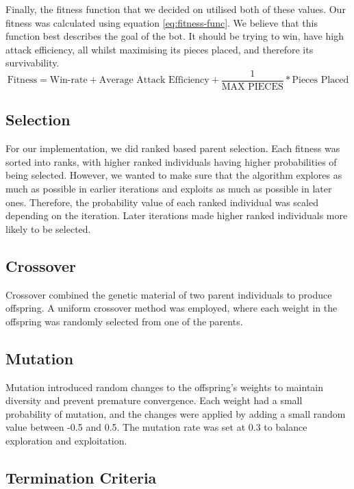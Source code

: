 \documentclass[a4paper, 12pt]{extreport}
\begin{document}
			Finally, the fitness function that we decided on utilised both of these values. Our fitness was calculated using equation \ref{eq:fitness-func}. We believe that this function best describes the goal of the bot. It should be trying to win, have high attack efficiency, all whilst maximising its pieces placed, and therefore its survivability.
			\begin{equation} \label{eq:fitness-func}
				\text{Fitness} = \text{Win-rate} + \text{Average Attack Efficiency} + \dfrac{1}{\text{MAX PIECES}} * \text{Pieces Placed}
			\end{equation}
			
		\subsection{Selection}
		
			For our implementation, we did ranked based parent selection. Each fitness was sorted into ranks, with higher ranked individuals having higher probabilities of being selected. However, we wanted to make sure that the algorithm explores as much as possible in earlier iterations and exploits as much as possible in later ones. Therefore, the probability value of each ranked individual was scaled depending on the iteration. Later iterations made higher ranked individuals more likely to be selected.
		
		\subsection{Crossover}
		
			Crossover combined the genetic material of two parent individuals to produce offspring. A uniform crossover method was employed, where each weight in the offspring was randomly selected from one of the parents.
		
		\subsection{Mutation}
		
			Mutation introduced random changes to the offspring's weights to maintain diversity and prevent premature convergence. Each weight had a small probability of mutation, and the changes were applied by adding a small random value between -0.5 and 0.5. The mutation rate was set at 0.3 to balance exploration and exploitation.
		
		\subsection{Termination Criteria}
		
\end{document}

